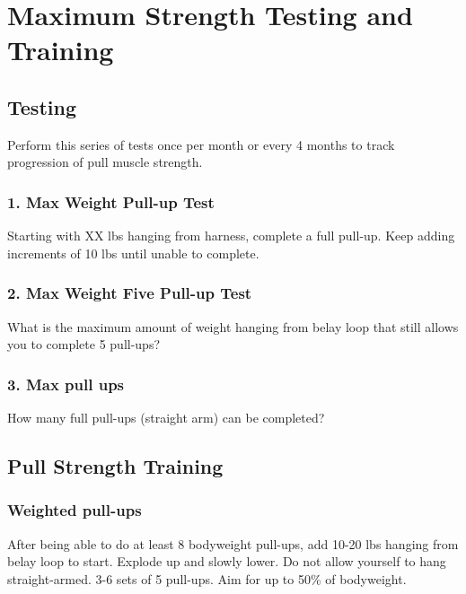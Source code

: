 \documentclass[12pt, letterpaper]{article}
\begin{document}
\newpage %


\section{Maximum Strength Testing and Training}

\subsection{Testing}
Perform this series of tests once per month or every 4 months to track progression
of pull muscle strength.

\subsubsection{1. Max Weight Pull-up Test}

Starting with XX lbs hanging from harness, complete a full pull-up.
Keep adding increments of 10 lbs until unable to complete. 

\subsubsection{2. Max Weight Five Pull-up Test}

What is the maximum amount of weight hanging from belay loop that still
allows you to complete 5 pull-ups?

\subsubsection{3. Max pull ups}

How many full pull-ups (straight arm) can be completed? 

\subsection{Pull Strength Training}

\subsubsection{Weighted pull-ups}

After being able to do at least 8 bodyweight pull-ups, add 10-20 lbs hanging 
from belay loop to start. Explode up and slowly lower. Do not allow yourself to hang straight-armed. 
3-6 sets of 5 pull-ups. Aim for up to 50\% of bodyweight. 
\end{document}
